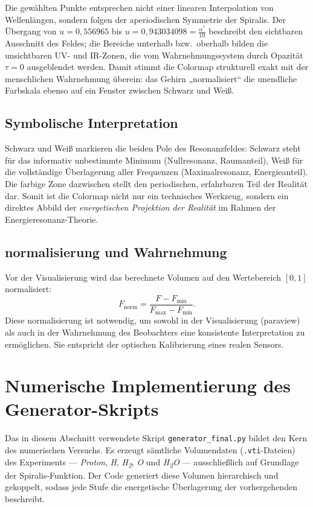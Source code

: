 Die gewählten Punkte entsprechen nicht einer linearen Interpolation 
von Wellenlängen, sondern folgen der aperiodischen Symmetrie der Spiralis.  
Der Übergang von $u=0{,}556965$ bis $u=0{,}943034098=\frac{\alpha^*}{10}$
beschreibt den sichtbaren Ausschnitt des Feldes; 
die Bereiche unterhalb bzw.\ oberhalb bilden 
die unsichtbaren UV- und IR-Zonen, die vom Wahrnehmungssystem 
durch Opazität $\tau=0$ ausgeblendet werden.  
Damit stimmt die Colormap strukturell exakt mit der menschlichen Wahrnehmung überein:
das Gehirn „normalisiert“ die unendliche Farbskala ebenso auf ein Fenster
zwischen Schwarz und Weiß.

\subsection{Symbolische Interpretation}

Schwarz und Weiß markieren die beiden Pole des Resonanzfeldes:
Schwarz steht für das informativ unbestimmte Minimum 
(Nullresonanz, Raumanteil), 
Weiß für die vollständige Überlagerung aller Frequenzen 
(Maximalresonanz, Energieanteil).  
Die farbige Zone dazwischen stellt den periodischen, 
erfahrbaren Teil der Realität dar.  
Somit ist die Colormap nicht nur ein technisches Werkzeug, 
sondern ein direktes Abbild der 
\emph{energetischen Projektion der Realität} 
im Rahmen der Energieresonanz-Theorie.



\subsection{\gls{normalisierung} und Wahrnehmung}

Vor der Visualisierung wird das berechnete Volumen auf den Wertebereich $[0,1]$
normalisiert:
\[
F_\text{norm} = \frac{F - F_\text{min}}{F_\text{max} - F_\text{min}}.
\]
Diese \gls{normalisierung} ist notwendig, um sowohl in der Visualisierung
(\gls{paraview}) als auch in der Wahrnehmung des Beobachters
eine konsistente Interpretation zu ermöglichen.
Sie entspricht der optischen Kalibrierung eines realen Sensors.

\section{Numerische Implementierung des Generator-Skripts}

Das in diesem Abschnitt verwendete Skript \texttt{generator\_final.py} bildet den Kern des numerischen Versuchs. Es erzeugt sämtliche Volumendaten (\texttt{.vti}-Dateien) des Experiments — \textit{Proton}, \textit{H}, \textit{H\textsubscript{2}}, \textit{O} und \textit{H\textsubscript{2}O} — ausschließlich auf Grundlage der Spiralis-Funktion. Der Code generiert diese Volumen hierarchisch und gekoppelt, sodass jede Stufe die energetische Überlagerung der vorhergehenden beschreibt.

